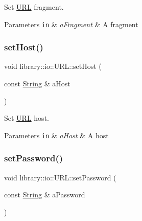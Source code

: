 Set \hyperlink{classlibrary_1_1io_1_1_u_r_l}{U\+RL} fragment. 


\begin{DoxyParams}[1]{Parameters}
\mbox{\tt in}  & {\em a\+Fragment} & A fragment \\
\hline
\end{DoxyParams}
\mbox{\label{classlibrary_1_1io_1_1_u_r_l_ab11ded07b47b35dbc0bb6907c0cfd5c5}} 
\subsubsection{\texorpdfstring{set\+Host()}{setHost()}}
{\footnotesize\ttfamily void library\+::io\+::\+U\+R\+L\+::set\+Host (\begin{DoxyParamCaption}\item[{const \hyperlink{namespacelibrary_1_1io_a7469b45835a4421045db344d6a5a1f85}{String} \&}]{a\+Host }\end{DoxyParamCaption})}



Set \hyperlink{classlibrary_1_1io_1_1_u_r_l}{U\+RL} host. 


\begin{DoxyParams}[1]{Parameters}
\mbox{\tt in}  & {\em a\+Host} & A host \\
\hline
\end{DoxyParams}
\mbox{\label{classlibrary_1_1io_1_1_u_r_l_a43360d356d992c5357117cd93b4eab06}} 
\subsubsection{\texorpdfstring{set\+Password()}{setPassword()}}
{\footnotesize\ttfamily void library\+::io\+::\+U\+R\+L\+::set\+Password (\begin{DoxyParamCaption}\item[{const \hyperlink{namespacelibrary_1_1io_a7469b45835a4421045db344d6a5a1f85}{String} \&}]{a\+Password }\end{DoxyParamCaption})}



